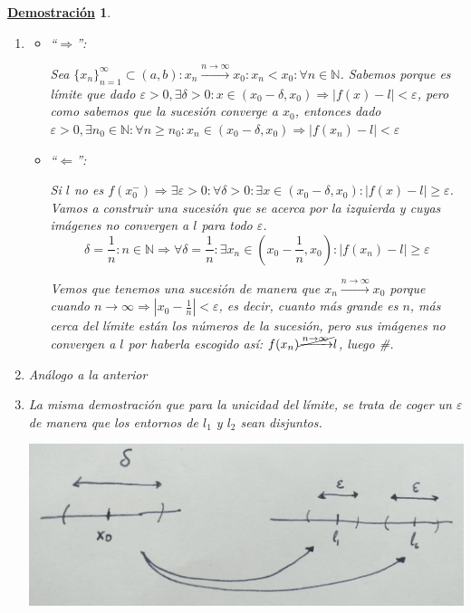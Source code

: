 \documentclass[10pt,a4paper,openright]{book}
\theoremstyle{break}
\newtheorem*{demo}{\underline{Demostración}}
\begin{document}
\begin{demo}
\begin{enumerate}
\item 
	\begin{itemize}
	\item ``$\Rightarrow$'':\par
	Sea $\{x_n\}_{n=1}^\infty\subset (a,b):  x_n\xrightarrow{n\rightarrow \infty} x_0: x_n< x_0: \forall n\in \mathbb N$. Sabemos porque es límite que dado $\varepsilon>0, \exists \delta>0: x\in(x_0-\delta, x_0)\Rightarrow |f(x)-l|<\varepsilon$, pero como sabemos que la sucesión converge a $x_0$, entonces dado $\varepsilon>0, \exists n_0\in \mathbb N: \forall n\geq n_0: x_n\in (x_0-\delta, x_0)\Rightarrow |f(x_n)-l|<\varepsilon$
	
	\item ``$\Leftarrow$'':\par
	Si $l$ no es $f(x_0^-)\Rightarrow \exists \varepsilon>0:\forall \delta>0: \exists x\in(x_0-\delta, x_0): |f(x)-l|\geq \varepsilon$. Vamos a construir una sucesión que se acerca por la izquierda y cuyas imágenes no convergen a $l$ para todo $\varepsilon$.
	$$\delta=\frac{1}{n}: n\in \mathbb N \Rightarrow \forall \delta=\frac{1}{n} : \exists x_n\in \left(x_0-\frac{1}{n}, x_0\right): |f(x_n)-l|\geq \varepsilon $$
	
	Vemos que tenemos una sucesión de manera que $ x_n\xrightarrow{n\rightarrow \infty} x_0$ porque cuando $n\rightarrow \infty\Rightarrow |x_0-\frac{1}{n}|<\varepsilon$, es decir, cuanto más grande es $n$, más cerca del límite están los números de la sucesión, pero sus imágenes no convergen a $l$ por haberla escogido así: $f(x_n)\cancel{\xrightarrow{n\rightarrow \infty}}l$, luego \#.
	\end{itemize}
	
\item Análogo a la anterior

\item La misma demostración que para la unicidad del límite, se trata de coger un $\varepsilon$ de manera que los entornos de $l_1$ y $l_2$ sean disjuntos.

\begin{center}
\includegraphics[scale=0.25]{unicidad limite lateral}
\end{center}

\end{enumerate}
\end{demo}
\end{document}
